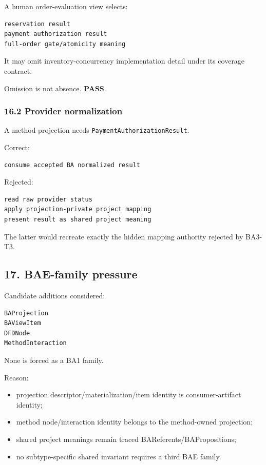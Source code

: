 \documentclass[11pt,a4paper]{article}
\providecommand{\tightlist}{\setlength{\itemsep}{0pt}\setlength{\parskip}{0pt}}
\begin{document}
A human order-evaluation view selects:

\begin{verbatim}
reservation result
payment authorization result
full-order gate/atomicity meaning
\end{verbatim}

It may omit inventory-concurrency implementation detail under its coverage contract.

Omission is not absence. \textbf{PASS}.

\subsubsection{16.2 Provider normalization}\label{162-provider-normalization}

A method projection needs \texttt{PaymentAuthorizationResult}.

Correct:

\begin{verbatim}
consume accepted BA normalized result
\end{verbatim}

Rejected:

\begin{verbatim}
read raw provider status
apply projection-private project mapping
present result as shared project meaning
\end{verbatim}

The latter would recreate exactly the hidden mapping authority rejected by BA3-T3.

\subsection{17. BAE-family pressure}\label{17-bae-family-pressure}

Candidate additions considered:

\begin{verbatim}
BAProjection
BAViewItem
DFDNode
MethodInteraction
\end{verbatim}

None is forced as a BA1 family.

Reason:

\begin{itemize}
\tightlist
\item
  projection descriptor/materialization/item identity is consumer-artifact identity;
\item
  method node/interaction identity belongs to the method-owned projection;
\item
  shared project meanings remain traced BAReferents/BAPropositions;
\item
  no subtype-specific shared invariant requires a third BAE family.
\end{itemize}
\end{document}
